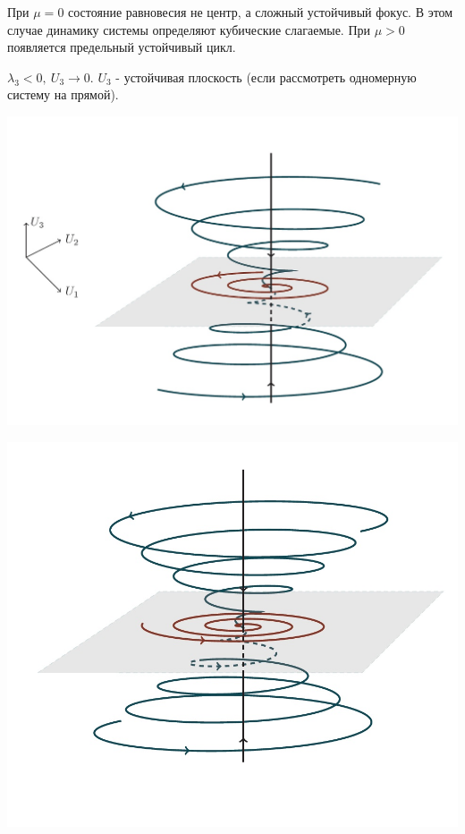 При $\mu=0$ состояние равновесия не центр, а сложный устойчивый фокус. В этом случае динамику системы определяют кубические слагаемые. При $\mu>0$ появляется предельный устойчивый цикл. 

$\lambda_3<0,~U_3 \rightarrow 0$. $U_3$ - устойчивая плоскость (если рассмотреть одномерную систему на прямой).

\begin{center}
    \begin{minipage}{0.32\linewidth}
        \includegraphics[width=\linewidth]{fig/55_1.jpg} 
        \vspace{-50pt}
        \label{fig:1}
    \end{minipage}
\hfill     
    \begin{minipage}{0.3\linewidth}
        \includegraphics[width=\linewidth]{fig/55_2.jpg} 

\end{minipage}
\end{center}
